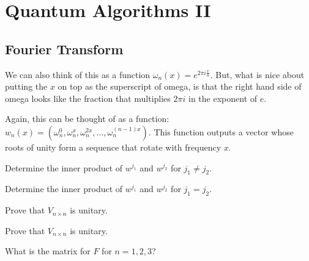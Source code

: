 
\chapter{Quantum Algorithms II}


\section{Fourier Transform}



We can also think of this as a function $\omega_n(x) = e^{2\pi i\frac{x}{n}}$.
But, what is nice about putting the $x$ on top as the superscript of omega, is that 
the right hand side of omega looks like 
the fraction that multiplies $2\pi i$ in the exponent of $e$.



Again, this can be thought of as a function: $w_n(x) = (\omega^0_n,\omega^x_n,\omega^{2x}_n,...,\omega^{(n-1)x}_n) $.
This function outputs a vector whose roots of unity form a sequence that rotate 
with frequency $x$. 


\begin{example}
Determine the inner product of $w^{j_1}$ and $w^{j_2}$ for $j_1 \neq j_2$. 
\end{example}

\begin{example}
Determine the inner product of $w^{j_1}$ and $w^{j_2}$ for $j_1 = j_2$. 
\end{example}


\begin{example}
Prove that $V_{n \times n}$ is unitary.
\end{example}


\begin{example}
Prove that $V_{n \times n}$ is unitary.
\end{example}



\begin{example}
What is the matrix for $F$ for $n = 1,2,3$?
\end{example}

